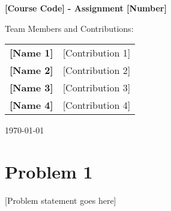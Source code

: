 \documentclass[11pt,a4paper]{article}
\begin{document}
\begin{titlepage}
\begin{center}
    \vspace*{2cm}
    
    {\huge \textbf{[Course Code] - Assignment [Number]}}
    
    \vspace{2cm}
    
    {\Large Team Members and Contributions:}
    
    \vspace{1cm}
    
    \begin{tabular}{p{4cm} p{8cm}}
    \textbf{[Name 1]} & [Contribution 1] \\[0.3cm]
    \textbf{[Name 2]} & [Contribution 2] \\[0.3cm]
    \textbf{[Name 3]} & [Contribution 3] \\[0.3cm]
    \textbf{[Name 4]} & [Contribution 4]
    \end{tabular}
    
    \vfill
    
    {\large \today}
\end{center}
\end{titlepage}

\newcommand{\true}{\textcolor{blue}{true}}
\newcommand{\false}{\textcolor{blue}{false}}
\renewcommand{\Square}{\tikz \draw[black] (0,0) rectangle (0.21,0.21);}
\newcommand{\bluesquare}{\textcolor{blue}{\tikz \fill[blue] (0,0) rectangle (0.2,0.2);}}
\renewcommand{\Circle}{\tikz \draw[black] (0,0) circle [radius=0.16];}
\newcommand{\bluecircle}{\textcolor{blue}{\tikz\fill[blue] (0,0) circle [radius=0.15];}}

\section*{Problem 1}
[Problem statement goes here]

\vspace{5cm}

\end{document}
